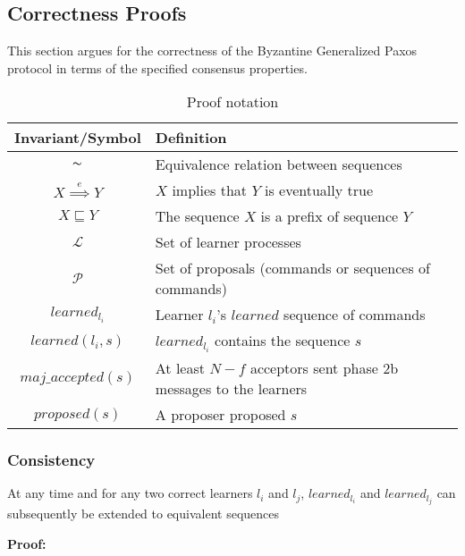\subsection{Correctness Proofs}

This section argues for the correctness of the Byzantine Generalized Paxos protocol in terms of the specified consensus properties.\par


\begin{table}[h!]
	\renewcommand{\arraystretch}{1.5}
	\centering
	\begin{tabularx}{\linewidth}{ |c|X|}
		\hline
		Invariant/Symbol & Definition \\
		\hline
		$\thicksim$ & Equivalence relation between sequences \\
		\hline
		$X \overset{e}{\implies} Y$ & $X$ implies that $Y$ is eventually true \\
		\hline
		$X \sqsubseteq Y$ & The sequence $X$ is a prefix of sequence $Y$ \\
		\hline
		$\mathcal{L}$ & Set of learner processes \\
		\hline
		$\mathcal{P}$ & Set of proposals (commands or sequences of commands) \\
		\hline
		$learned_{l_i}$ & Learner $l_i$'s $learned$ sequence of commands \\
		\hline
		$learned(l_i,s)$ & $learned_{l_i}$ contains the sequence $s$ \\
		\hline
		$maj\_accepted(s)$ & At least $N-f$ acceptors sent phase 2b messages to the learners\\
		\hline
		$proposed(s)$ & A proposer proposed $s$ \\
		\hline
		
  	\end{tabularx} 
	\caption{Proof notation} 
	\label{table:1}
\end{table}

\subsubsection{Consistency}
\begin{theorem}At any time and for any two correct learners $l_i$ and $l_j$, $learned_{l_i}$ and $learned_{l_j}$ can subsequently be extended to equivalent sequences \par
\end{theorem} 
\textbf{Proof:} \par


